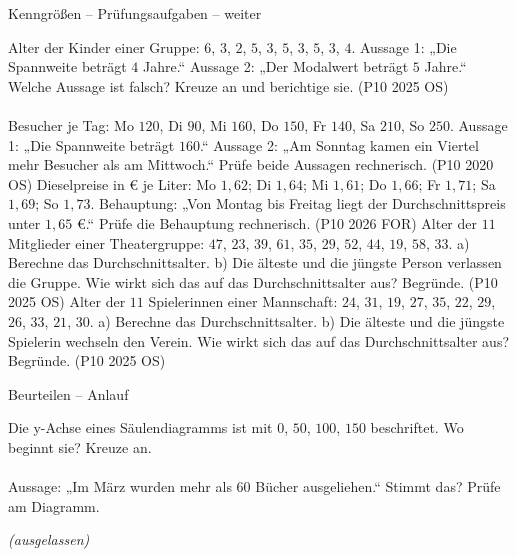 \begin{aufgabe}{Kenngrößen – Prüfungsaufgaben – weiter}
\begin{teile}
\teil Alter der Kinder einer Gruppe: $6$, $3$, $2$, $5$, $3$, $5$, $3$, $5$, $3$, $4$. Aussage 1: „Die Spannweite beträgt $4$ Jahre.“ Aussage 2: „Der Modalwert beträgt $5$ Jahre.“ Welche Aussage ist falsch? Kreuze an und berichtige sie. \hfill (P10 2025 OS)\\  \\ 
\teil Besucher je Tag: Mo $120$, Di $90$, Mi $160$, Do $150$, Fr $140$, Sa $210$, So $250$. Aussage 1: „Die Spannweite beträgt $160$.“ Aussage 2: „Am Sonntag kamen ein Viertel mehr Besucher als am Mittwoch.“ Prüfe beide Aussagen rechnerisch. \hfill (P10 2020 OS)
\teil Dieselpreise in € je Liter: Mo $1{,}62$; Di $1{,}64$; Mi $1{,}61$; Do $1{,}66$; Fr $1{,}71$; Sa $1{,}69$; So $1{,}73$. Behauptung: „Von Montag bis Freitag liegt der Durchschnittspreis unter $1{,}65$ €.“ Prüfe die Behauptung rechnerisch. \hfill (P10 2026 FOR)
\steil Alter der $11$ Mitglieder einer Theatergruppe: $47$, $23$, $39$, $61$, $35$, $29$, $52$, $44$, $19$, $58$, $33$. a) Berechne das Durchschnittsalter. b) Die älteste und die jüngste Person verlassen die Gruppe. Wie wirkt sich das auf das Durchschnittsalter aus? Begründe. \hfill (P10 2025 OS)
\steil Alter der $11$ Spielerinnen einer Mannschaft: $24$, $31$, $19$, $27$, $35$, $22$, $29$, $26$, $33$, $21$, $30$. a) Berechne das Durchschnittsalter. b) Die älteste und die jüngste Spielerin wechseln den Verein. Wie wirkt sich das auf das Durchschnittsalter aus? Begründe. \hfill (P10 2025 OS)
\end{teile}
\end{aufgabe}

\begin{aufgabe}{Beurteilen – Anlauf}
\begin{teile}
\teil Die y-Achse eines Säulendiagramms ist mit $0$, $50$, $100$, $150$ beschriftet. Wo beginnt sie? Kreuze an.\\  \\ 
\teil Aussage: „Im März wurden mehr als $60$ Bücher ausgeliehen.“ Stimmt das? Prüfe am Diagramm.

% 
\teil \textit{(ausgelassen)}
\end{teile}
\end{aufgabe}

